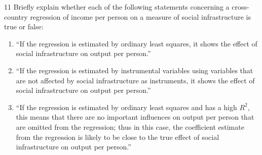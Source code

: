 \begin{problem}{11}
Briefly explain whether each of the following statements concerning a cross-country regression of income per person on a measure of social infrastructure is true or false:
\begin{enumerate}[label=(\alph*)]
    \item ``If the regression is estimated by ordinary least squares, it shows the effect of social infrastructure on output per person.''
    \item ``If the regression is estimated by instrumental variables using variables that are not affected by social infrastructure as instruments, it shows the effect of social infrastructure on output per person.''
    \item ``If the regression is estimated by ordinary least squares and has a high \(R^2\), this means that there are no important influences on output per person that are omitted from the regression; thus in this case, the coefficient estimate from the regression is likely to be close to the true effect of social infrastructure on output per person.''
\end{enumerate}
\end{problem}

